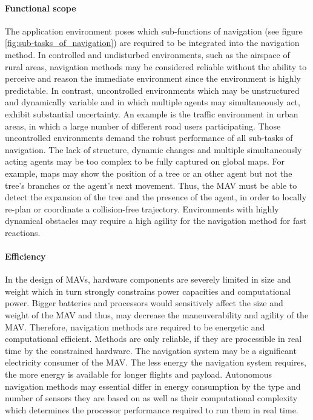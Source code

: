 \paragraph{Functional scope}
The application environment poses which sub-functions of navigation (see figure \ref{fig:sub-tasks_of_navigation}) 
are required to be integrated into the navigation method.
In controlled and undisturbed environments, such as the airspace of rural areas,
navigation methods may be considered reliable without the ability to perceive and reason the immediate environment
since the environment is highly predictable.
In contrast, uncontrolled environments which may be unstructured and dynamically variable and 
in which multiple agents may simultaneously act, exhibit substantial uncertainty.
An example is the traffic environment in urban areas, in which a large number of different road users participating. 
Those uncontrolled environments demand the robust performance of all sub-tasks of navigation.
The lack of structure, dynamic changes and multiple simultaneously acting agents
may be too complex to be fully captured on global maps.
For example, maps may show the position of a tree or an other agent but not the tree's branches or the agent's next movement.
Thus, the MAV must be able to detect the expansion of the tree and the presence of the agent,
in order to locally re-plan or coordinate a collision-free trajectory.
Environments with highly dynamical obstacles may require a high agility for
the navigation method for fast reactions.


\paragraph{Efficiency}
In the design of MAVs, hardware components are severely limited in size and weight
which in turn strongly constrains power capacities and computational power.
Bigger batteries and processors would sensitively affect the size and weight of the MAV 
and thus, may decrease the maneuverability and agility of the MAV. \cite{Verbeke2017}
Therefore, navigation methods are required to be energetic and computational efficient.
Methods are only reliable, if they are processible in real time by the constrained hardware.
The navigation system may be a significant electricity consumer of the MAV.
The less energy the navigation system requires, the more energy is available for longer flights and payload.
Autonomous navigation methods may essential differ in energy consumption by the type and number of sensors they are based on
as well as their computational complexity which determines the processor performance required to run them in real time. \cite{Chao2010}


